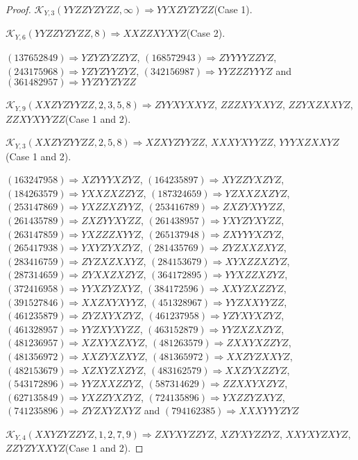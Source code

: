 \documentclass[12pt]{article}
\theoremstyle{plain}
\theoremstyle{definition}
\theoremstyle{remark}
\newcommand{\fancy}[1]{\mathcal{#1}}
\def\K{\fancy{K}}
\begin{document}
\begin{proof}
	$\K_{Y,3}(YYZZYZYZZ,\infty)\Rightarrow $$YYXZYZYZZ$(Case 1).
	
	$\K_{Y,6}(YYZZYZYZZ,8)\Rightarrow $$XXZZXYXYZ$(Case 2).
	
	
	
	$(1 3 7 6 5 2 8 4 9)\Rightarrow YZYZYZZYZ$, $(1 6 8 5 7 2 9 4 3)\Rightarrow ZYYYYZZYZ$, $(2 4 3 1 7 5 9 6 8)\Rightarrow YZYZYYZYZ$, $(3 4 2 1 5 6 9 8 7)\Rightarrow YYZZZYYYZ$ and $(3 6 1 4 8 2 9 5 7)\Rightarrow YYZYYZYZZ$
	
	
	$\K_{Y,9}(XXZYZYYZZ,2, 3, 5, 8)\Rightarrow $$ZYYXYXXYZ$, $ZZZXYXXYZ$, $ZZYXZXXYZ$, $ZZXYXYYZZ$(Case 1 and 2).
	
	$\K_{Y,3}(XXZYZYYZZ,2, 5, 8)\Rightarrow $$XZXYZYYZZ$, $XXXYXYYZZ$, $YYYXZXXYZ$(Case 1 and 2).
	
	
	
	$(1 6 3 2 4 7 9 5 8)\Rightarrow XZYYYXZYZ$, $(1 6 4 2 3 5 8 9 7)\Rightarrow XYZZYXZYZ$, $(1 8 4 2 6 3 5 7 9)\Rightarrow YXXZXZZYZ$, $(1 8 7 3 2 4 6 5 9)\Rightarrow YZXXZXZYZ$, $(2 5 3 1 4 7 8 6 9)\Rightarrow YXZZXZYYZ$, $(2 5 3 4 1 6 7 8 9)\Rightarrow ZXZYXYYZZ$, $(2 6 1 4 3 5 7 8 9)\Rightarrow ZXZYYXYZZ$, $(2 6 1 4 3 8 9 5 7)\Rightarrow YXYZYXYZZ$, $(2 6 3 1 4 7 8 5 9)\Rightarrow YXZZZXYYZ$, $(2 6 5 1 3 7 9 4 8)\Rightarrow ZXYYYXZYZ$, $(2 6 5 4 1 7 9 3 8)\Rightarrow YXYZYXZYZ$, $(2 8 1 4 3 5 7 6 9)\Rightarrow ZYZXXZXYZ$, $(2 8 3 4 1 6 7 5 9)\Rightarrow ZYZXZXXYZ$, $(2 8 4 1 5 3 6 7 9)\Rightarrow XYXZZXZYZ$, $(2 8 7 3 1 4 6 5 9)\Rightarrow ZYXXZXZYZ$, $(3 6 4 1 7 2 8 9 5)\Rightarrow YYXZZXZYZ$, $(3 7 2 4 1 6 9 5 8)\Rightarrow YYXZYZXYZ$, $(3 8 4 1 7 2 5 9 6)\Rightarrow XXYZXZZYZ$, $(3 9 1 5 2 7 8 4 6)\Rightarrow XXZXYXYYZ$, $(4 5 1 3 2 8 9 6 7)\Rightarrow YYZXXYYZZ$, $(4 6 1 2 3 5 8 7 9)\Rightarrow ZYZXYXZYZ$, $(4 6 1 2 3 7 9 5 8)\Rightarrow YZYXYXZYZ$, $(4 6 1 3 2 8 9 5 7)\Rightarrow YYZXYXYZZ$, $(4 6 3 1 5 2 8 7 9)\Rightarrow YYZXZXZYZ$, $(4 8 1 2 3 6 9 5 7)\Rightarrow XZXYXZXYZ$, $(4 8 1 2 6 3 5 7 9)\Rightarrow ZXXYXZZYZ$, $(4 8 1 3 5 6 9 7 2)\Rightarrow XXZYXZXYZ$, $(4 8 1 3 6 5 9 7 2)\Rightarrow XXZYZXXYZ$, $(4 8 2 1 5 3 6 7 9)\Rightarrow XZXYZXZYZ$, $(4 8 3 1 6 2 5 7 9)\Rightarrow XXZYXZZYZ$, $(5 4 3 1 7 2 8 9 6)\Rightarrow YYZXXZZYZ$, $(5 8 7 3 1 4 6 2 9)\Rightarrow ZZXXYXZYZ$, $(6 2 7 1 3 5 8 4 9)\Rightarrow YXZZYXZYZ$, $(7 2 4 1 3 5 8 9 6)\Rightarrow YXZZYZXYZ$, $(7 4 1 2 3 5 8 9 6)\Rightarrow ZYZXYZXYZ$ and $(7 9 4 1 6 2 3 8 5)\Rightarrow XXXYYYZYZ$
	
	
	$\K_{Y,4}(XXYZYZZYZ,1, 2, 7, 9)\Rightarrow $$ZXYXYZZYZ$, $XZYXYZZYZ$, $XXYXYZXYZ$, $ZZYZYXXYZ$(Case 1 and 2).
	

\end{proof}
\end{document}
